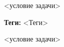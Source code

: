 \documentclass[idxtotoc,hyperref,openany,oneside]{files/pwn} %
\begin{document}
\begin{tcolorbox}
<условие задачи>
\end{tcolorbox}



\textbf{Теги:} <Теги>\vspace{\baselineskip}

\begin{tcolorbox}
<условие задачи>
\end{tcolorbox}

\end{document}
